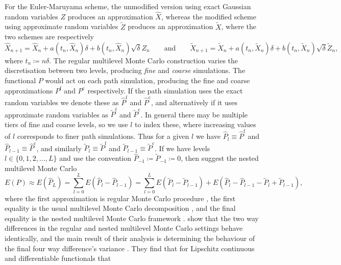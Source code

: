 \documentclass[manuscript,review]{acmart}
\begin{document}
For the Euler-Maruyama scheme, the unmodified version using exact Gaussian random variables $ Z $ produces an approximation $ \hat{X} $, whereas the modified scheme using approximate random variables $ \tilde{Z} $ produces an approximation $ \tilde{X} $, where the two schemes are respectively
\begin{equation*}
\hat{X}_{n+1} = \hat{X}_n + a(t_n, \hat{X}_n) \delta + b(t_n, \hat{X}_n)\sqrt{\delta} Z_n
\qquad \text{and} \qquad 
\tilde{X}_{n+1} = \tilde{X}_n + a(t_n, \tilde{X}_n) \delta + b(t_n, \tilde{X}_n)\sqrt{\delta} \tilde{Z}_n,
\end{equation*}
where $ t_n \coloneqq n \delta $. The regular multilevel Monte Carlo construction varies the discretisation between two levels, producing \emph{fine} and \emph{coarse} simulations. The functional $ P $ would act on each path simulation, producing the fine and coarse approximations $ P^{\mathrm{f}} $ and $ P^{\mathrm{c}} $ respectively. If the path simulation uses the exact random variables we denote these as $ \hat{P}^{\mathrm{f}} $ and $ \hat{P}^{\mathrm{c}} $, and alternatively if it uses approximate random variables as $ \tilde{P}^{\mathrm{f}} $ and $ \tilde{P}^{\mathrm{c}} $. In general there may be multiple tiers of fine and coarse levels, so we use $ l $ to index these, where increasing values of $ l $ corresponds to finer path simulations. Thus for a given $ l $ we have $ \hat{P}_l \equiv \hat{P}^{\mathrm{f}} $ and $ \hat{P}_{l-1} \equiv \hat{P}^{\mathrm{c}} $, and similarly $ \tilde{P}_l \equiv \tilde{P}^{\mathrm{f}} $ and $ \tilde{P}_{l-1} \equiv \tilde{P}^{\mathrm{c}} $. If we have levels $ l \in \{0, 1, 2, \ldots, L\} $ and use the convention $ \hat{P}_{-1} \coloneqq \tilde{P}_{-1} \coloneqq 0 $, then \citet{giles2020approximate} suggest the nested multilevel Monte Carlo
\begin{equation*}
E(P) 
\approx
E(\hat{P}_L) 
= 
\sum_{l = 0}^{L} E(\hat{P}_l - \hat{P}_{l-1}) 
= 
\sum_{l = 0}^{L} E(\tilde{P}_l - \tilde{P}_{l-1}) +  E(\hat{P}_l - \hat{P}_{l-1} - \tilde{P}_l + \tilde{P}_{l-1}),
\end{equation*}
where the first approximation is regular Monte Carlo procedure \citep{glasserman2013monte}, the first equality is the usual multilevel Monte Carlo decomposition \citep{giles2008multilevel}, and the final equality is the nested multilevel Monte Carlo framework \citep{giles2020approximate,sheridan2020nested}.
\citeauthor{giles2020approximate} \citep{giles2020approximate,sheridan2020nested} show that the two way differences in the regular and nested multilevel Monte Carlo settings behave identically, and the main result of their analysis is determining the behaviour of the final four way difference's variance \citep[lemmas~4.10 and 4.11]{giles2020approximate} \citep[corollaries~6.2.6.2 and 6.2.6.3]{sheridan2020nested}. They find that for Lipschitz continuous and differentiable functionals that 
\end{document}
